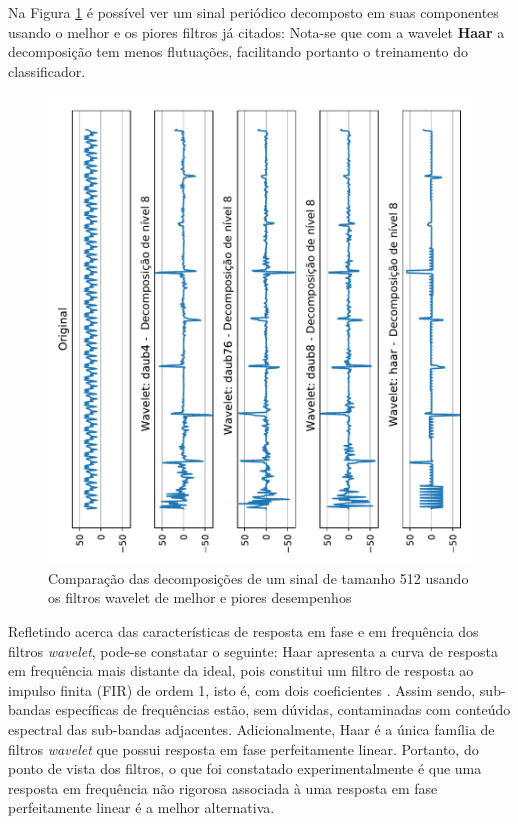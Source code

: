 	\par Na Figura \ref{fig:haardaub42comparison} é possível ver um sinal periódico decomposto em suas componentes usando o melhor e os piores filtros já citados: Nota-se que com a wavelet \textbf{Haar} a decomposição tem menos flutuações, facilitando portanto o treinamento do classificador.

	\begin{figure}[H]
		\centering
		\includegraphics[width=.93\linewidth,angle=-90]{images/results/haarDaubComparison/haarDaub42Comparison}
		\caption{Comparação das decomposições de um sinal de tamanho 512 usando os filtros wavelet de melhor e piores desempenhos }
		\label{fig:haardaub42comparison}
	\end{figure}
		
	\par Refletindo acerca das características de resposta em fase e em frequência dos filtros \textit{wavelet}, pode-se constatar o seguinte: Haar apresenta a curva de resposta em frequência mais distante da ideal, pois constitui um filtro de resposta ao impulso finita (FIR) de ordem 1, isto é, com dois coeficientes \cite{WaveletPropertiesBrowser}. Assim sendo, sub-bandas específicas de frequências estão, sem dúvidas, contaminadas com conteúdo espectral das sub-bandas adjacentes. Adicionalmente, Haar é a única família de filtros \textit{wavelet} que possui resposta em fase perfeitamente linear. Portanto, do ponto de vista dos filtros, o que foi constatado experimentalmente é que uma resposta em frequência não rigorosa associada à uma resposta em fase perfeitamente linear é a melhor alternativa.
	
